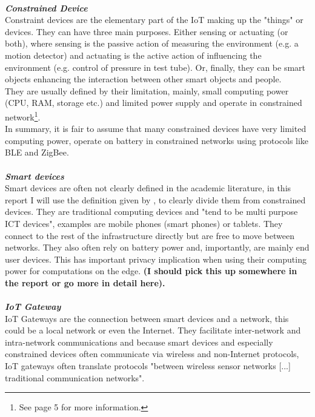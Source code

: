 \vspace{0.5mm} \ \\
\textbf{\textit{Constrained Device}}\\
Constraint devices are the elementary part of the IoT 
making up the "things" or devices\cite{contstraintDevicesTerminology}.
They can have three main purposes.
Either sensing or actuating (or both), where sensing is the 
passive action of measuring the environment (e.g. a motion detector) and actuating is the active action of influencing the environment (e.g. control of pressure in test tube). Or, finally, they can be smart objects enhancing the interaction between other smart objects and people.\\
They are usually defined by their limitation, mainly, small computing power (CPU, RAM, storage etc.) and limited power supply and operate in constrained network\footnote{See \cite{contstraintDevicesTerminology} page 5 for more information.}.\\
In summary, it is fair to assume that many constrained devices have very limited computing power, operate on battery in constrained networks using protocols like BLE and ZigBee. \\
\vspace{0.5mm} \ \\
\textbf{\textit{Smart devices}}\\
Smart devices are often not clearly defined in the academic literature, in this report I will use the definition given by \citeauthor{poslad2011smartDevices}\cite{poslad2011smartDevices}, to clearly divide them from constrained devices. They are traditional computing devices and "tend to be multi purpose ICT devices"\cite{poslad2011smartDevices}, examples are mobile phones (smart phones) or tablets. They connect to the rest of the infrastructure directly but are free to move between networks. They also often rely on battery power and, importantly, are mainly end user devices. This has important privacy implication when using their computing power for computations on the edge. \textbf{(I should pick this up somewhere in the report or go more in detail here).}\\
\vspace{0.5mm} \ \\
\textbf{\textit{IoT Gateway}}\\
IoT Gateways are the connection between smart devices and a network, this could be a local network or even the Internet. They facilitate inter-network and intra-network communications and because smart devices and especially constrained devices often communicate via wireless and non-Internet protocols, IoT gateways often translate protocols "between wireless sensor networks [...] traditional communication networks"\cite{zhu2010iotGatewayDefinition}.
